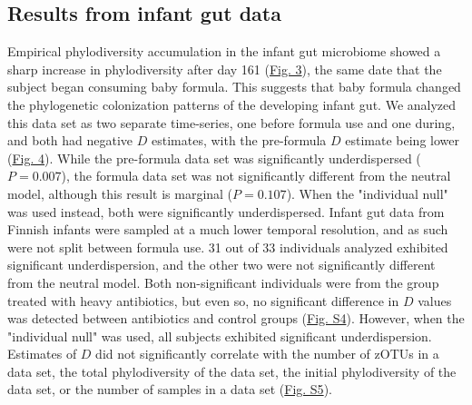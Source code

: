 \documentclass{article}
\begin{document}
\subsection{Results from infant gut data}
Empirical phylodiversity accumulation in the infant gut microbiome \cite{Koenig2011} showed a sharp increase in phylodiversity after day 161 (\hyperref[sec:figure3]{Fig. 3}), the same date that the subject began consuming baby formula. This suggests that baby formula changed the phylogenetic colonization patterns of the developing infant gut. We analyzed this data set as two separate time-series, one before formula use and one during, and both had negative \(D\) estimates, with the pre-formula \(D\) estimate being lower (\hyperref[sec:figure4]{Fig. 4}). While the pre-formula data set was significantly underdispersed (\(P = 0.007\)), the formula data set was not significantly different from the neutral model, although this result is marginal (\(P = 0.107\)). When the "individual null" was used instead, both were significantly underdispersed. Infant gut data from Finnish infants \cite{Yassour2016} were sampled at a much lower temporal resolution, and as such were not split between formula use. 31 out of 33 individuals analyzed exhibited significant underdispersion, and the other two were not significantly different from the neutral model. Both non-significant individuals were from the group treated with heavy antibiotics, but even so, no significant difference in \(D\) values was detected between antibiotics and control groups (\hyperref[sec:figureS4]{Fig. S4}). However, when the "individual null" was used, all subjects exhibited significant underdispersion. Estimates of \(D\) did not significantly correlate with the number of zOTUs in a data set, the total phylodiversity of the data set, the initial phylodiversity of the data set, or the number of samples in a data set (\hyperref[sec:figureS5]{Fig. S5}). 


\end{document}

